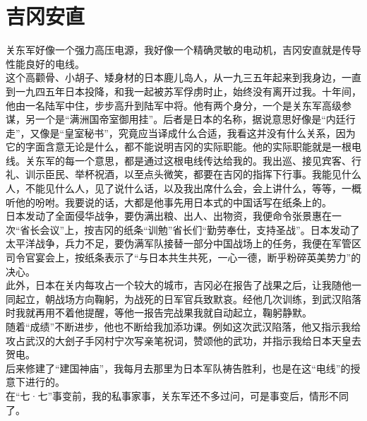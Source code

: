 \fancyhead[RO]{} %
\fancyhead[LE]{} %
\chapter*{吉冈安直}
\thispagestyle{empty}
关东军好像一个强力高压电源，我好像一个精确灵敏的电动机，吉冈安直就是传导性能良好的电线。\\

这个高颧骨、小胡子、矮身材的日本鹿儿岛人，从一九三五年起来到我身边，一直到一九四五年日本投降，和我一起被苏军俘虏时止，始终没有离开过我。十年间，他由一名陆军中住，步步高升到陆军中将。他有两个身分，一个是关东军高级参谋，另一个是“满洲国帝室御用挂”。后者是日本的名称，据说意思好像是“内廷行走”，又像是“皇室秘书”，究竟应当译成什么合适，我看这并没有什么关系，因为它的字面含意无论是什么，都不能说明吉冈的实际职能。他的实际职能就是一根电线。关东军的每一个意思，都是通过这根电线传达给我的。我出巡、接见宾客、行礼、训示臣民、举杯祝酒，以至点头微笑，都要在吉冈的指挥下行事。我能见什么人，不能见什么人，见了说什么话，以及我出席什么会，会上讲什么，等等，一概听他的吩咐。我要说的话，大都是他事先用日本式的中国话写在纸条上的。\\

日本发动了全面侵华战争，要伪满出粮、出人、出物资，我便命令张景惠在一次“省长会议”上，按吉冈的纸条“训勉”省长们“勤劳奉仕，支持圣战”。日本发动了太平洋战争，兵力不足，要伪满军队接替一部分中国战场上的任务，我便在军管区司令官宴会上，按纸条表示了“与日本共生共死，一心一德，断乎粉碎英美势力”的决心。\\

此外，日本在关内每攻占一个较大的城市，吉冈必在报告了战果之后，让我随他一同起立，朝战场方向鞠躬，为战死的日军官兵致默哀。经他几次训练，到武汉陷落时我就再用不着他提醒，等他一报告完战果我就自动起立，鞠躬静默。\\

随着“成绩”不断进步，他也不断给我加添功课。例如这次武汉陷落，他又指示我给攻占武汉的大刽子手冈村宁次写亲笔祝词，赞颂他的武功，并指示我给日本天皇去贺电。\\

后来修建了“建国神庙”，我每月去那里为日本军队祷告胜利，也是在这“电线”的授意下进行的。\\

在“七·七”事变前，我的私事家事，关东军还不多过问，可是事变后，情形不同了。\\

